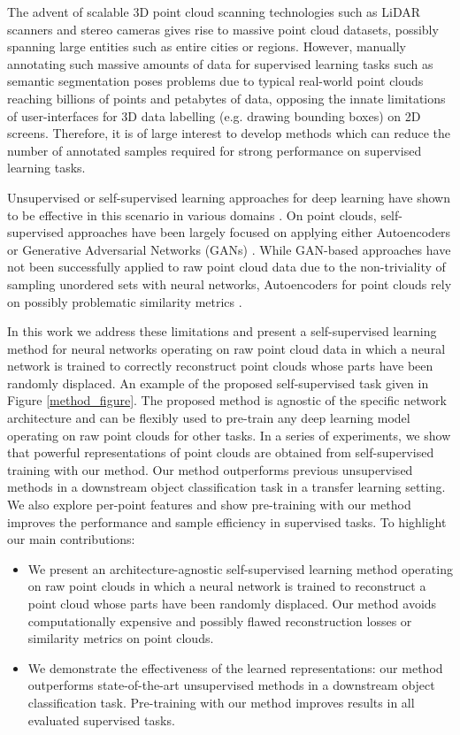 \documentclass{article}
\begin{document}
The advent of scalable 3D point cloud scanning technologies such as LiDAR scanners and stereo cameras gives rise to massive point cloud datasets, possibly spanning large entities such as entire cities or regions. However, manually annotating such massive amounts of data for supervised learning tasks such as semantic segmentation poses problems due to typical real-world point clouds reaching billions of points and petabytes of data, opposing the innate limitations of user-interfaces for 3D data labelling (e.g. drawing bounding boxes) on 2D screens. Therefore, it is of large interest to develop methods which can reduce the number of annotated samples required for strong performance on supervised learning tasks. 

Unsupervised or self-supervised learning approaches for deep learning have shown to be effective in this scenario in various domains \cite{gan, wordvectors, autoencoder, contextprediction, jigsaw, rotation}. On point clouds, self-supervised approaches have been largely focused on applying either Autoencoders \cite{autoencoder} or Generative Adversarial Networks (GANs) \cite{gan}. While GAN-based approaches have not been successfully applied to raw point cloud data due to the non-triviality of sampling unordered sets with neural networks, Autoencoders for point clouds rely on possibly problematic similarity metrics \cite{latentgan}. 

In this work we address these limitations and present a self-supervised learning method for neural networks operating on raw point cloud data in which a neural network is trained to correctly reconstruct point clouds whose parts have been randomly displaced. An example of the proposed self-supervised task given in Figure \ref{method_figure}. The proposed method is agnostic of the specific network architecture and can be flexibly used to pre-train any deep learning model operating on raw point clouds for other tasks. In a series of experiments, we show that powerful representations of point clouds are obtained from self-supervised training with our method. Our method outperforms previous unsupervised methods in a downstream object classification task in a transfer learning setting. We also explore per-point features and show pre-training with our method improves the performance and sample efficiency in supervised tasks. To highlight our main contributions:


\begin{itemize}
    \item We present an architecture-agnostic self-supervised learning method operating on raw point clouds in which a neural network is trained to reconstruct a point cloud whose parts have been randomly displaced. Our method avoids computationally expensive and possibly flawed reconstruction losses or similarity metrics on point clouds.
\item We demonstrate the effectiveness of the learned representations: our method outperforms state-of-the-art unsupervised methods in a downstream object classification task. Pre-training with our method improves results in all evaluated supervised tasks.
\end{itemize}
\end{document}
